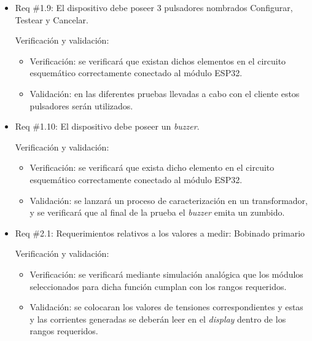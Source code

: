 \documentclass[11pt]{charter}
\begin{document}
\begin{itemize} 
\item Req \#1.9: El dispositivo debe poseer 3 pulsadores nombrados Configurar, Testear y Cancelar.

Verificación y validación:

\begin{itemize}
\item Verificación: se verificará que existan dichos elementos en el circuito esquemático correctamente conectado al módulo ESP32.
\item Validación: en las diferentes pruebas llevadas a cabo con el cliente estos pulsadores serán utilizados.
\end{itemize}

\end{itemize}

\begin{itemize} 
\item Req \#1.10: El dispositivo debe poseer un \textit{buzzer}.

Verificación y validación:

\begin{itemize}
\item Verificación: se verificará que exista dicho elemento en el circuito esquemático correctamente conectado al módulo ESP32.
\item Validación: se lanzará un proceso de caracterización en un transformador, y se verificará que al final de la prueba el \textit{buzzer} emita un zumbido.
\end{itemize}

\end{itemize}

\begin{itemize} 
\item Req \#2.1: Requerimientos relativos a los valores a medir: Bobinado primario

Verificación y validación:

\begin{itemize}
\item Verificación: se verificará mediante simulación analógica que los módulos seleccionados para dicha función cumplan con los rangos requeridos.
\item Validación: se colocaran los valores de tensiones correspondientes y estas y las corrientes generadas se deberán leer en el \textit{display} dentro de los rangos requeridos.
\end{itemize}

\end{itemize}
\end{document}
